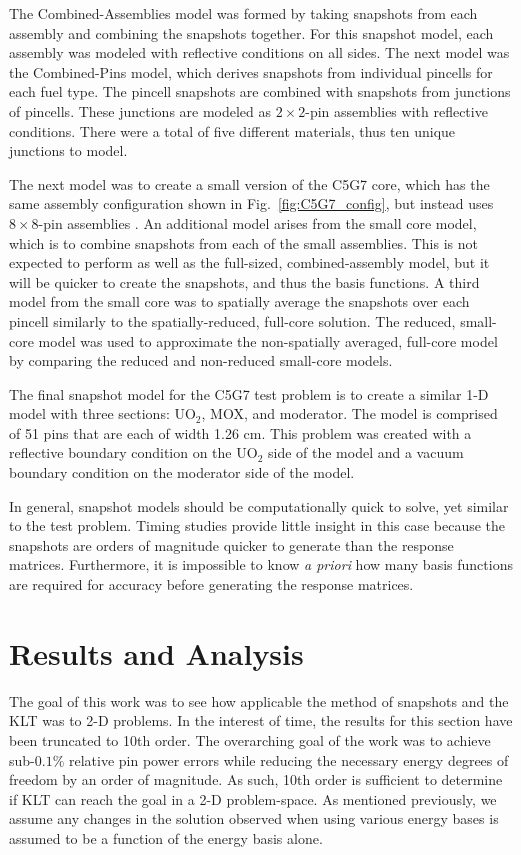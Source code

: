 \documentclass{anstrans}
\newcommand{\FIG}[1]{Fig.~\ref{#1}}               %
\begin{document}
The Combined-Assemblies model was formed by taking snapshots from each assembly
and combining the snapshots together.  For this snapshot model, each assembly
was modeled with reflective conditions on all sides.  The next model was the
Combined-Pins model, which derives snapshots from individual pincells for each
fuel type.  The pincell snapshots are combined with snapshots from junctions of
pincells. These junctions are modeled as
$2\times2$-pin assemblies with
reflective conditions.  There were a total of five different materials, thus
ten unique junctions to model.

The next model was to create a small version of the C5G7 core, which
has the same assembly configuration shown in \FIG{fig:C5G7_config}, but
instead uses $8\times8$-pin assemblies \cite{reedThesis}.  An additional model
arises from the small core model, which is to combine snapshots from each of the
small assemblies.  This is not expected to perform as well as the full-sized,
combined-assembly model, but it will be quicker to create the snapshots, and
thus the basis functions.  A third model from the small core was to spatially
average the snapshots over each pincell similarly to the spatially-reduced,
full-core solution.  The reduced, small-core model was used to approximate the
non-spatially averaged, full-core model by comparing the reduced and non-reduced
small-core models.

The final snapshot model for the C5G7 test problem is to create a
similar 1-D model \cite{reedThesis} with three sections: UO$_2$, MOX, and
moderator.  The model is comprised of 51 pins that are each of width 1.26 cm.
This problem was created with a reflective boundary condition on the UO$_2$
side of the model and a vacuum boundary condition on the moderator side of the
model.

In general, snapshot models should
be computationally quick to solve, yet similar to the test problem.  Timing
studies provide little insight in this case because the snapshots are orders of
magnitude quicker to generate than the response matrices. Furthermore, it is
impossible to know {\it a priori} how many basis functions are required for
accuracy before generating the response matrices.

\section{Results and Analysis}

The goal of this work was to see how applicable the method of snapshots and
the KLT was to 2-D problems.  In the interest of time, the results for
this section have been truncated to 10th order.  The overarching goal of the
work was to achieve sub-$0.1\%$ relative pin
power errors while reducing the necessary energy degrees of freedom by an order
of magnitude.  As such, 10th order is sufficient to determine if KLT can reach
the goal in a 2-D problem-space.  As mentioned previously, we assume any
changes in the solution observed when using
various energy bases is assumed to be a function of the energy basis alone.
\end{document}
